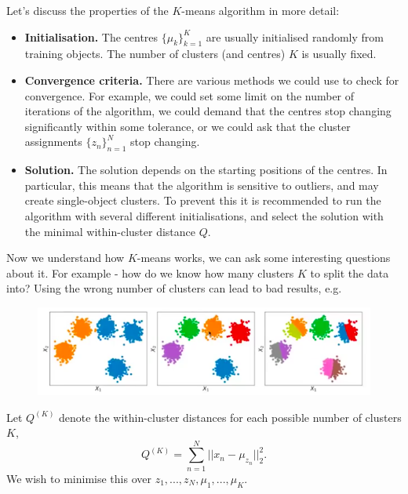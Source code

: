 Let's discuss the properties of the $K$-means algorithm in more detail:
\begin{itemize}
\item \textbf{Initialisation.} The centres $\{\mu_k\}_{k=1}^{K}$ are usually initialised randomly from training objects. The number of clusters (and centres) $K$ is usually fixed.
\item \textbf{Convergence criteria.} There are various methods we could use to check for convergence. For example, we could set some limit on the number of iterations of the algorithm, we could demand that the centres stop changing significantly within some tolerance, or we could ask that the cluster assignments $\{z_n\}_{n=1}^{N}$ stop changing.
\item \textbf{Solution.} The solution depends on the starting positions of the centres. In particular, this means that the algorithm is sensitive to outliers, and may create single-object clusters. To prevent this it is recommended to run the algorithm with several different initialisations, and select the solution with the minimal within-cluster distance $Q$. 
\end{itemize}



\newpage
Now we understand how $K$-means works, we can ask some interesting questions about it. For example - how do we know how many clusters $K$ to split the data into? Using the wrong number of clusters can lead to bad results, e.g.
\begin{figure}[H]
\centering
\includegraphics[scale=0.4]{wrongclusters.png}
\end{figure}
Let $Q^{(K)}$ denote the within-cluster distances for each possible number of clusters $K$,
\begin{equation*}
Q^{(K)} = \sum_{n=1}^{N} ||x_n - \mu_{z_n}||_2^2.
\end{equation*}
We wish to minimise this over $z_1,...,z_N, \mu_1,...,\mu_K$.\\

